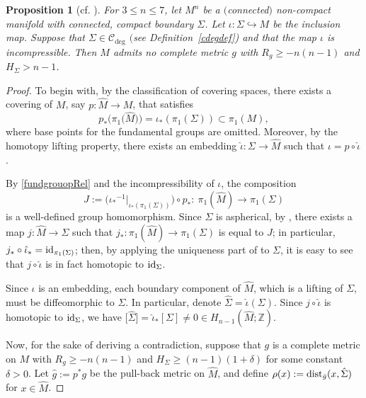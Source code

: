 \documentclass[10pt,a4paper]{amsart}
\numberwithin{equation}{section}
\newtheorem{Prop}[Theorem]{Proposition}
\def\id{{\rm id}}
\def\dist{{\rm dist}}
\begin{document}
\begin{Prop}[{cf. \cite[Theorem~1.1]{CLSZ2021}}]\label{incprssArg}
    For $3\leq n\leq 7$, let $M^n$ be a $($connected$)$ non-compact manifold with connected, compact boundary $\Sigma$.
    Let $\iota\colon \Sigma\hookrightarrow M$ be the inclusion map. Suppose that $\Sigma\in \mathcal{C}_{\deg}$ $($see Definition~{\rm \ref{cdegdef})}
    and that the map
    $\iota$ is incompressible. Then $M$ admits no complete metric $g$ with  $R_g\geq-n(n-1)$ and $H_{\Sigma}> n-1$.
\end{Prop}
\begin{proof}
    To begin with, by the classification of covering spaces, there exists a covering of $M$, say $p\colon\hat{M}\rightarrow M$, that satisfies
    \begin{equation} \label{fundgrouopRel}
    	p_*\bigl(\pi_1\bigl(\hat{M}\bigr)\bigr)=\iota_*(\pi_1(\Sigma))\subset \pi_1(M),
    \end{equation}
    where base points for the fundamental groups are omitted. Moreover, by the homotopy lifting property, there exists an embedding
    $\hat{\iota}\colon \Sigma \rightarrow \hat{M}$ such that $\iota = p\circ\hat \iota$.

    By \eqref{fundgrouopRel} and the incompressibility of $\iota$, the composition
    \[
    	J:= \big({\iota_*}^{-1}\big|_{\iota_*(\pi_1(\Sigma))}\big)\circ p_*\colon \  \pi_1(\hat{M})\rightarrow \pi_1(\Sigma)
    \]
    is a well-defined group homomorphism.
     Since $\Sigma$ is aspherical, by \cite[Proposition 1B.9]{Hatcher_AT}, there exists a map $j\colon \hat{M}\rightarrow \Sigma$ such that $j_*\colon \pi_1(\hat{M})\rightarrow \pi_1(\Sigma)$ is equal to $J$;
     in particular,  $j_*\circ\hat\iota_* = \id_{\pi_1(\Sigma)}$; then, by applying the uniqueness part of  \cite[Proposition 1B.9]{Hatcher_AT} to $\Sigma$, it is easy to see that
     $j\circ \hat\iota$ is in fact homotopic to $\id_{\Sigma}$.

	Since $\iota$ is an embedding, each boundary component of $\hat M$, which is a lifting of $\Sigma$, must be
	diffeomorphic to $\Sigma$. In particular, denote $\hat{\Sigma}=\hat\iota(\Sigma)$.
	Since $j\circ \hat \iota$ is homotopic to $\id_\Sigma$, we have $\bigl[\hat{\Sigma}\bigr] = \hat\iota_*[\Sigma]\neq 0 \in H_{n-1}(\hat{M};\mathbb{Z})$.
		
	Now, for the sake of deriving a contradiction, suppose that $g$ is a complete metric on $M$ with $R_g\geq-n(n-1)$ and $H_{\Sigma}\geq (n-1)(1+\delta)$ for some constant $\delta>0$. Let $\hat{g}:=p^*g$ be the pull-back metric on $\hat M$, and define
	$\rho(x):=\dist_{\hat{g}}(x,\hat{\Sigma})$ for $x\in \hat{M}$.
	

\end{proof}
\end{document}
